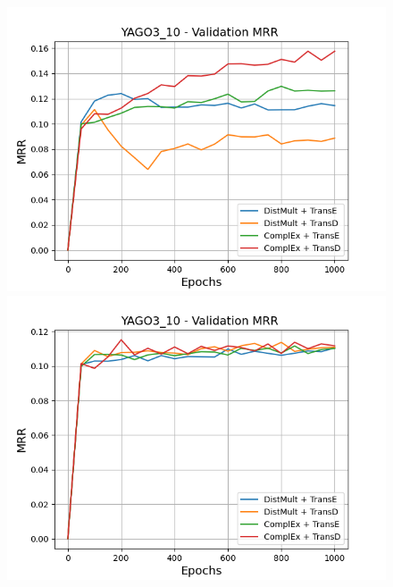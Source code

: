 \begin{figure}[H]
    \centering
    \begin{minipage}{.45\textwidth}
      \centering
      \includegraphics[width=0.9\linewidth]{figures/results/gan_train/not_pretrained/uncertainty/max/entropy/yago3_10/1k_epochs/uncertainty_yago3_10_mrrs.png}
    \end{minipage}%
    \begin{minipage}{.45\textwidth}
      \centering
      \includegraphics[width=0.9\linewidth]{figures/results/gan_train/not_pretrained/uncertainty/max_distribution/entropy/yago3_10/1k_epochs/uncertainty_yago3_10_mrrs.png}
    \end{minipage}
    \begin{minipage}{.45\textwidth}
      \centering

\end{minipage}
\end{figure}
